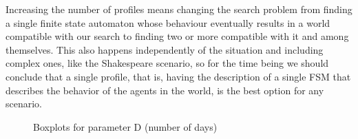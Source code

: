 \documentclass[runningheads,a4paper]{llncs}
\begin{document}
Increasing the number of profiles means changing the search problem
from finding a single finite state automaton whose behaviour
eventually results in a world compatible with our search to finding
two or more compatible with it and among themselves. This also happens
independently of the situation and including complex ones, like the
Shakespeare scenario, so for the time being we should conclude that a
single profile, that is, having the description of a single FSM that
describes the behavior of the agents in the world, is the best option for any scenario. 

\begin{figure}
        \centering
        \caption{Boxplots for parameter D (number of
          days)}\label{fig:boxplotsD} %
\end{figure}
\end{document}
